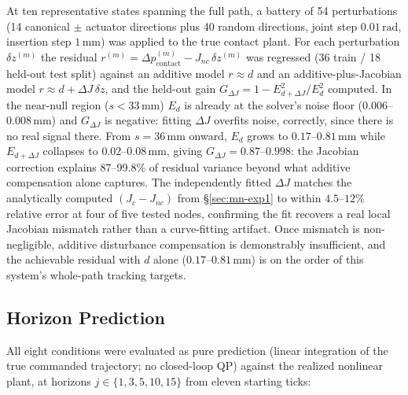 \documentclass[journal]{IEEEtran}
\begin{document}
At ten representative states spanning the full path, a battery of 54
perturbations (14 canonical $\pm$ actuator directions plus 40 random
directions, joint step $0.01\,\mathrm{rad}$, insertion step
$1\,\mathrm{mm}$) was applied to the true contact plant. For each
perturbation $\delta z^{(m)}$ the residual
$r^{(m)}=\Delta p_{\mathrm{contact}}^{(m)} - J_{nc}\,\delta z^{(m)}$
was regressed (36 train / 18 held-out test split) against an additive
model $r\approx d$ and an additive-plus-Jacobian model
$r\approx d+\Delta J\,\delta z$, and the held-out gain
$G_{\Delta J}=1-E_{d+\Delta J}^2/E_d^2$ computed. In the near-null
region ($s<33\,\mathrm{mm}$) $E_d$ is already at the solver's noise
floor ($0.006$--$0.008\,\mathrm{mm}$) and $G_{\Delta J}$ is negative:
fitting $\Delta J$ overfits noise, correctly, since there is no real
signal there. From $s=36\,\mathrm{mm}$ onward, $E_d$ grows to
$0.17$--$0.81\,\mathrm{mm}$ while $E_{d+\Delta J}$ collapses to
$0.02$--$0.08\,\mathrm{mm}$, giving $G_{\Delta J}=0.87$--$0.998$: the
Jacobian correction explains 87--99.8\% of residual variance beyond
what additive compensation alone captures. The independently fitted
$\Delta J$ matches the analytically computed $(J_c-J_{nc})$ from
\S\ref{sec:mn-exp1} to within $4.5$--$12\%$ relative error at four of
five tested nodes, confirming the fit recovers a real local Jacobian
mismatch rather than a curve-fitting artifact. Once mismatch is
non-negligible, additive disturbance compensation is demonstrably
insufficient, and the achievable residual with $d$ alone
($0.17$--$0.81\,\mathrm{mm}$) is on the order of this system's
whole-path tracking targets.

\subsection{Horizon Prediction}
\label{sec:mn-exp3}

All eight conditions were evaluated as pure prediction (linear
integration of the true commanded trajectory; no closed-loop QP)
against the realized nonlinear plant, at horizons
$j\in\{1,3,5,10,15\}$ from eleven starting ticks:
\end{document}
